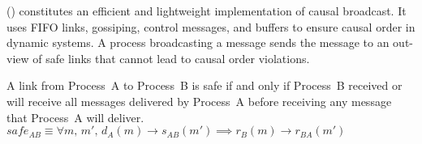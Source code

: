 \PCBROADCAST (\REF) constitutes an efficient and lightweight implementation of
causal broadcast.  It uses FIFO links, gossiping, control messages, and buffers
to ensure causal order in dynamic systems. A process broadcasting a message
sends the message to an out-view of safe links that cannot lead to causal order
violations.

\begin{definition}
  A link from Process~A to Process~B is safe if and only if Process~B received
  or will receive all messages delivered by Process~A before receiving any
  message that Process~A will
  deliver. $safe_{AB} \equiv \forall m,\, m',\, d_A(m) \rightarrow s_{AB}(m')
  \implies r_B(m) \rightarrow r_{BA}(m')$
\end{definition}

%
%
%
%

